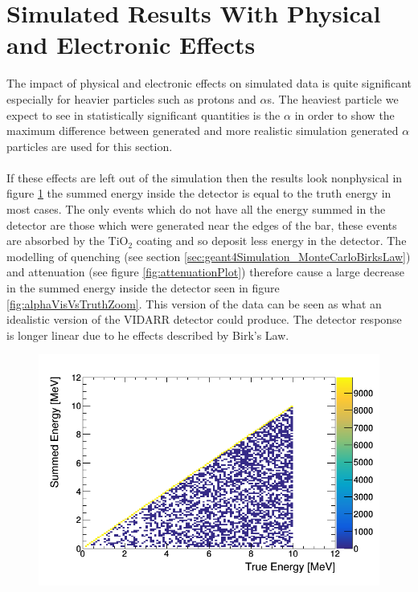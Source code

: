 \section{Simulated Results With Physical and Electronic Effects}\label{sec:geant4Simulation_resultsPhysicalElectronics}
The impact of physical and electronic effects on simulated data is quite significant especially for heavier particles such as protons and $\alpha$s. The heaviest particle we expect to see in statistically significant quantities is the $\alpha$ in order to show the maximum difference between generated and more realistic simulation generated $\alpha$ particles are used for this section. 
\\\\If these effects are left out of the simulation then the results look nonphysical in figure \ref{fig:alpha_summed_vs_truth} the summed energy inside the detector is equal to the truth energy in most cases. The only events which do not have all the energy summed in the detector are those which were generated near the edges of the bar, these events are absorbed by the TiO$_2$ coating and so deposit less energy in the detector. The modelling of quenching (see section \ref{sec:geant4Simulation_MonteCarloBirksLaw}) and attenuation (see figure \ref{fig:attenuationPlot}) therefore cause a large decrease in the summed energy inside the detector seen in figure \ref{fig:alphaVisVsTruthZoom}. This version of the data can be seen as what an idealistic version of the VIDARR detector could produce. The detector response is longer linear due to he effects described by Birk's Law. 
\begin{figure}[htbp]
 \centering
 \includegraphics[width=0.7\linewidth]{truth_vs_summed_alpha.png}
 \label{fig:alpha_summed_vs_truth}
\end{figure}
